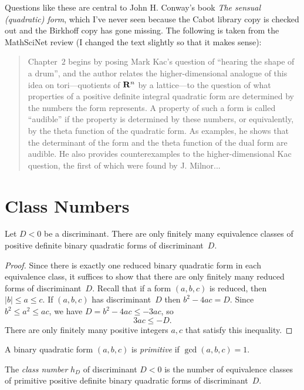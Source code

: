 \documentclass[11pt]{report}
\begin{document}
Questions like these are central to John H. Conway's book {\em The
    sensual (quadratic) form}, which I've never seen because the Cabot
library copy is checked out and the Birkhoff copy has gone missing.  The
following is taken from the {\sc MathSciNet} review (I changed the
text slightly so that it makes sense):
\begin{quote}
  Chapter~$2$ begins by posing Mark Kac's question of ``hearing the
  shape of a drum'', and the author relates the higher-dimensional
  analogue of this idea on tori---quotients of $\mathbf{R}\sp n$ by a
  lattice---to the question of what properties of a positive definite
  integral quadratic form are determined by the numbers the form
  represents. A property of such a form is called ``audible'' if the
  property is determined by these numbers, or equivalently, by the theta
  function of the quadratic form. As examples, he shows that the
  determinant of the form and the theta function of the dual form are
  audible. He also provides counterexamples to the higher-dimensional
  Kac question, the first of which were found by J. Milnor...
\end{quote}

\section{Class Numbers}
\begin{proposition}\label{prop:finite}
  Let $D<0$ be a discriminant.  There are only finitely
  many equivalence classes of positive definite binary
  quadratic forms of discriminant~$D$.
\end{proposition}
\begin{proof}
  Since there is exactly one reduced binary quadratic form
  in each equivalence class, it suffices to show that there are
  only finitely many reduced forms of discriminant~$D$.  Recall
  that if a form $(a,b,c)$ is reduced, then
  $|b| \leq a \leq c$.
  If $(a,b,c)$ has discriminant~$D$ then $b^2-4ac=D$.
  Since $b^2\leq a^2 \leq ac$, we have
  $D = b^2-4ac\leq -3ac$, so
  $$
    3ac \leq -D.
  $$
  There are only finitely many positive integers $a,c$ that
  satisfy this inequality.
\end{proof}

\begin{definition}
  A binary quadratic form $(a,b,c)$ is {\em primitive}
  if $\gcd(a,b,c)=1$.
\end{definition}

\begin{definition}
  The {\em class number} $h_D$ of discriminant $D<0$ is the number
  of equivalence classes of primitive positive definite binary
  quadratic forms of discriminant~$D$.
\end{definition}
\end{document}
